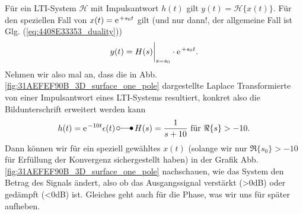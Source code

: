 \documentclass[11pt,a4paper,DIV=12]{scrartcl}
\numberwithin{equation}{section}
\numberwithin{figure}{section}
\newcommand{\eq}[1]{Glg. (\ref{#1})} %
\newcommand{\fig}[1]{Abb. \ref{#1}} %
\begin{document}
\begin{Loesung}
Für ein LTI-System $\mathcal{H}$ mit Impulsantwort $h(t)$ gilt
$y(t) = \mathcal{H}\{x(t)\}$.
Für den speziellen Fall von $x(t)=\e^{+s_0 t}$ gilt (und nur dann!,
der allgemeine Fall ist \eq{eq:4408E33353_duality})
\begin{equation}
y(t) = H(s)\bigg|_{s=s_0} \cdot \e^{+s_0 t}.
\end{equation}
%
Nehmen wir also mal an, dass die in \fig{fig:31AEFEF90B_3D_surface_one_pole}
dargestellte Laplace Transformierte von einer Impulsantwort eines LTI-Systems resultiert,
konkret also die Bildunterschrift erweitert werden kann
\begin{equation}
\label{eq_31AEFEF90B_LaplaceExample_hH}
h(t) = \e^{-10 t} \epsilon(t) \, \laplace \, H(s) = \frac{1}{s+10}\text{ für }\Re\{s\} > -10.
\end{equation}
Dann können wir für ein speziell gewähltes $x(t)$ (solange wir nur $\Re\{s_0\} > -10$
für Erfüllung der Konvergenz sichergestellt haben) in der Grafik \fig{fig:31AEFEF90B_3D_surface_one_pole}
nachschauen, wie das System den Betrag des Signals ändert, also ob das Ausgangssignal
verstärkt (>0dB) oder gedämpft (<0dB) ist. Gleiches geht auch für die Phase, was
wir uns für später aufheben.


\end{Loesung}


\end{document}
